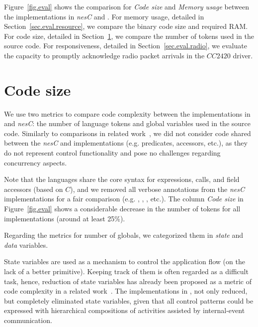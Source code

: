 Figure~\ref{fig.eval} shows the comparison for \emph{Code size} and 
\emph{Memory usage} between the implementations in \emph{nesC} and \CEU.
%
For memory usage, detailed in Section~\ref{sec.eval.resource}, we compare the 
binary code size and required RAM.
%
For code size, detailed in Section~\ref{sec.eval.code}, we compare the number 
of tokens used in the source code.
%
For responsiveness, detailed in Section~\ref{sec.eval.radio}, we evaluate the 
capacity to promptly acknowledge radio packet arrivals in the $CC2420$ driver.

\section{Code size}
\label{sec.eval.code}

We use two metrics to compare code complexity between the implementations in 
\CEU and \emph{nesC}: the number of language tokens and global variables used 
in the source code.
%
Similarly to comparisons in related work~\cite{wsn.ocram,wsn.protothreads}, we 
did not consider code shared between the \emph{nesC} and \CEU implementations 
(e.g. predicates,  accessors, etc.), as they do not represent 
control functionality and pose no challenges regarding concurrency aspects.

%
Note that the languages share the core syntax for expressions, calls, and field 
accessors (based on $C$), and we removed all verbose annotations from the 
\emph{nesC} implementations for a fair comparison (e.g. , 
, , etc.).
%
The column \emph{Code size} in Figure~\ref{fig.eval} shows a considerable 
decrease in the number of tokens for all implementations (around at least 
25\%).

Regarding the metrics for number of globals, we categorized them in 
\emph{state} and \emph{data} variables.

State variables are used as a mechanism to control the application flow (on the 
lack of a better primitive).
Keeping track of them is often regarded as a difficult task, hence, reduction 
of state variables has already been proposed as a metric of code complexity in 
a related work~\cite{wsn.protothreads}.
The implementations in \CEU, not only reduced, but completely eliminated state 
variables, given that all control patterns could be expressed with hierarchical 
compositions of activities assisted by internal-event communication.

